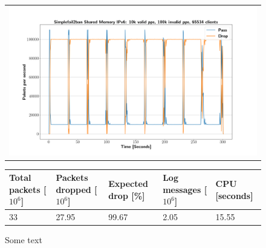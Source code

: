 \begin{figure}[p]
	\label{fig:simplefail2ban:shm:ip6:100k}
	\centering
	\scriptsize
	\begin{tabular}{c}
    	\centerline{\includegraphics[width=1.2\textwidth]{images/simplefail2ban_shm_ipv6_v10k_iv100k_c65534.png}}
	\end{tabular}
	\begin{tabular}{lllll}
		\toprule
		\textbf{Total packets [$10^6$]} & \textbf{Packets dropped [$10^6$]} & \textbf{Expected drop [\%]} & \textbf{Log messages [$10^6$]} & \textbf{CPU [seconds]} \\ \midrule 
		33 & 27.95 & 99.67 & 2.05 & 15.55 \\
		\bottomrule
	\end{tabular}
	\caption[Simplefail2ban Shared Memory IPv6 100k PPS]{Some text}
\end{figure}

